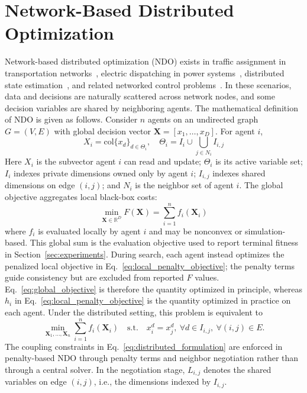 \documentclass[conference]{IEEEtran}
\begin{document}
\section{Network-Based Distributed Optimization}\label{sec:problem}
Network-based distributed optimization (NDO) exists in traffic assignment in transportation networks~\cite{ref_ndo_traffic_2022}, electric dispatching in power systems~\cite{ref_ndo_dispatch_2024}, distributed state estimation~\cite{ref_ndo_stateest_2024}, and related networked control problems~\cite{ref_ndo_netcontrol_2024}. In these scenarios, data and decisions are naturally scattered across network nodes, and some decision variables are shared by neighboring agents. The mathematical definition of NDO is given as follows. Consider $n$ agents on an undirected graph $G=(V,E)$ with global decision vector $\mathbf{X}=[x_1,\ldots,x_D]$. For agent $i$,
\begin{equation}
X_i = \mathrm{col}\{x_d\}_{d \in \Theta_i}, \quad \Theta_i = I_i \cup \bigcup_{j \in N_i} I_{i,j}
\label{eq:local_variable_set}
\end{equation}
Here $X_i$ is the subvector agent $i$ can read and update; $\Theta_i$ is its active variable set; $I_i$ indexes private dimensions owned only by agent $i$; $I_{i,j}$ indexes shared dimensions on edge $(i,j)$; and $N_i$ is the neighbor set of agent $i$. The global objective aggregates local black-box costs:
\begin{equation}
\min_{\mathbf{X}\in\mathbb{R}^D} F(\mathbf{X}) = \sum_{i=1}^{n} f_i(\mathbf{X}_i)
\label{eq:global_objective}
\end{equation}
where $f_i$ is evaluated locally by agent $i$ and may be nonconvex or simulation-based. This global sum is the evaluation objective used to report terminal fitness in Section~\ref{sec:experiments}. During search, each agent instead optimizes the penalized local objective in Eq.~\eqref{eq:local_penalty_objective}; the penalty terms guide consistency but are excluded from reported $F$ values. Eq.~\eqref{eq:global_objective} is therefore the quantity optimized in principle, whereas $h_i$ in Eq.~\eqref{eq:local_penalty_objective} is the quantity optimized in practice on each agent. Under the distributed setting, this problem is equivalent to
\begin{equation}
\min_{\mathbf{X}_1,\ldots,\mathbf{X}_n} \sum_{i=1}^{n} f_i(\mathbf{X}_i)
\quad \text{s.t.} \quad x_i^d = x_j^d,\ \forall d\in I_{i,j},\ \forall (i,j)\in E.
\label{eq:distributed_formulation}
\end{equation}
The coupling constraints in Eq.~\eqref{eq:distributed_formulation} are enforced in penalty-based NDO through penalty terms and neighbor negotiation rather than through a central solver. In the negotiation stage, $L_{i,j}$ denotes the shared variables on edge $(i,j)$, i.e., the dimensions indexed by $I_{i,j}$.
\end{document}
